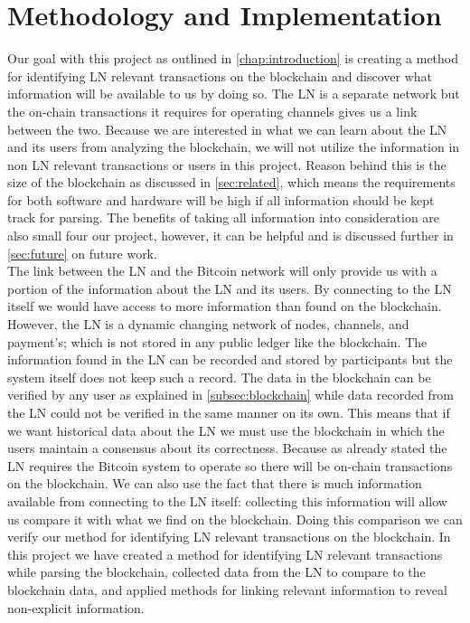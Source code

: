 \chapter{Methodology and Implementation}
\label{chap:metodology}

Our goal with this project as outlined in \cref{chap:introduction} is creating a method for identifying LN relevant transactions on the blockchain and discover what information will be available to us by doing so. The LN is a separate network but the on-chain transactions it requires for operating channels gives us a link between the two. Because we are interested in what we can learn about the LN and its users from analyzing the blockchain, we will not utilize the information in non LN relevant transactions or users in this project. Reason behind this is the size of the blockchain as discussed in \cref{sec:related}, which means the requirements for both software and hardware will be high if all information should be kept track for parsing. The benefits of taking all information into consideration are also small four our project, however, it can be helpful and is discussed further in \cref{sec:future} on future work. 
\\

The link between the LN and the Bitcoin network will only provide us with a portion of the information about the LN and its users. By connecting to the LN itself we would have access to more information than found on the blockchain. However, the LN is a dynamic changing network of nodes, channels, and payment's; which is not stored in any public ledger like the blockchain. The information found in the LN can be recorded and stored by participants but the system itself does not keep such a record. The data in the blockchain can be verified by any user as explained in \cref{subsec:blockchain} while data recorded from the LN could not be verified in the same manner on its own.
This means that if we want historical data about the LN we must use the blockchain in which the users maintain a consensus about its correctness. Because as already stated the LN requires the Bitcoin system to operate so there will be on-chain transactions on the blockchain. We can also use the fact that there is much information available from connecting to the LN itself: collecting this information will allow us compare it with what we find on the blockchain. Doing this comparison we can verify our method for identifying LN relevant transactions on the blockchain. 
In this project we have created a method for identifying LN relevant transactions while parsing the blockchain, collected data from the LN to compare to the blockchain data, and applied methods for linking relevant information to reveal non-explicit information. 

